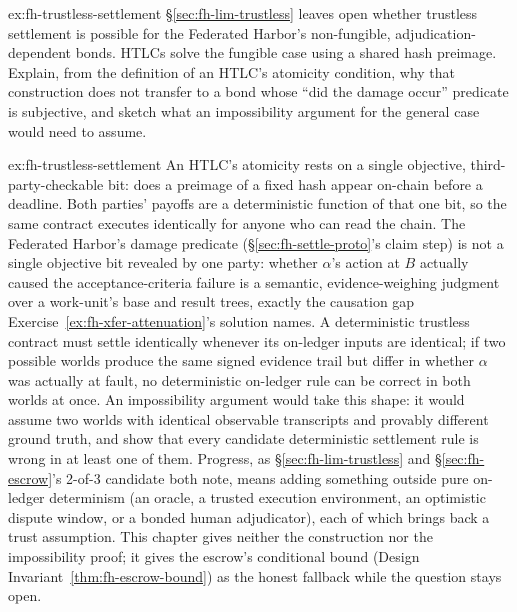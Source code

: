 \documentclass[11pt,a4paper]{article}
\theoremstyle{definition}
\theoremstyle{remark}
\begin{document}
\begin{pdexercise}[kind=Open,rating=3]{ex:fh-trustless-settlement}
\S\ref{sec:fh-lim-trustless} leaves open whether trustless settlement is possible for the Federated Harbor's non-fungible, adjudication-dependent bonds. HTLCs solve the fungible case using a shared hash preimage. Explain, from the definition of an HTLC's atomicity condition, why that construction does not transfer to a bond whose ``did the damage occur'' predicate is subjective, and sketch what an impossibility argument for the general case would need to assume.
\end{pdexercise}
\begin{pdsolution}{ex:fh-trustless-settlement}
An HTLC's atomicity rests on a single objective, third-party-checkable bit: does a preimage of a fixed hash appear on-chain before a deadline. Both parties' payoffs are a deterministic function of that one bit, so the same contract executes identically for anyone who can read the chain. The Federated Harbor's damage predicate (\S\ref{sec:fh-settle-proto}'s claim step) is not a single objective bit revealed by one party: whether $\alpha$'s action at $B$ actually caused the acceptance-criteria failure is a semantic, evidence-weighing judgment over a work-unit's base and result trees, exactly the causation gap Exercise~\ref{ex:fh-xfer-attenuation}'s solution names. A deterministic trustless contract must settle identically whenever its on-ledger inputs are identical; if two possible worlds produce the same signed evidence trail but differ in whether $\alpha$ was actually at fault, no deterministic on-ledger rule can be correct in both worlds at once. An impossibility argument would take this shape: it would assume two worlds with identical observable transcripts and provably different ground truth, and show that every candidate deterministic settlement rule is wrong in at least one of them. Progress, as \S\ref{sec:fh-lim-trustless} and \S\ref{sec:fh-escrow}'s 2-of-3 candidate both note, means adding something outside pure on-ledger determinism (an oracle, a trusted execution environment, an optimistic dispute window, or a bonded human adjudicator), each of which brings back a trust assumption. This chapter gives neither the construction nor the impossibility proof; it gives the escrow's conditional bound (Design Invariant~\ref{thm:fh-escrow-bound}) as the honest fallback while the question stays open.
\end{pdsolution}
\end{document}
